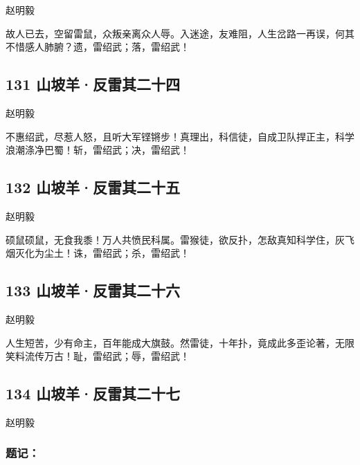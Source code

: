 {赵明毅}

故人已去，空留雷鼠，众叛亲离众人辱。入迷途，友难阻，人生岔路一再误，何其不惜感人肺腑？遗，雷绍武；落，雷绍武！
~\\

\hypertarget{ux5c71ux5761ux7f8aux53cdux96f7ux5176ux4e8cux5341ux56db}{%
\subsection{131
山坡羊·反雷其二十四}\label{ux5c71ux5761ux7f8aux53cdux96f7ux5176ux4e8cux5341ux56db}}

{赵明毅}

不惠绍武，尽惹人怒，且听大军铿锵步！真理出，科信徒，自成卫队捍正主，科学浪潮涤净巴蜀！斩，雷绍武；决，雷绍武！
~\\

\hypertarget{ux5c71ux5761ux7f8aux53cdux96f7ux5176ux4e8cux5341ux4e94}{%
\subsection{132
山坡羊·反雷其二十五}\label{ux5c71ux5761ux7f8aux53cdux96f7ux5176ux4e8cux5341ux4e94}}

{赵明毅}

硕鼠硕鼠，无食我黍！万人共愤民科属。雷猴徒，欲反扑，怎敌真知科学住，灰飞烟灭化为尘土！诛，雷绍武；杀，雷绍武！

\hypertarget{ux5c71ux5761ux7f8aux53cdux96f7ux5176ux4e8cux5341ux516d}{%
\subsection{133
山坡羊·反雷其二十六}\label{ux5c71ux5761ux7f8aux53cdux96f7ux5176ux4e8cux5341ux516d}}

{赵明毅}

人生短苦，少有命主，百年能成大旗鼓。然雷徒，十年扑，竟成此多歪论著，无限笑料流传万古！耻，雷绍武；辱，雷绍武！

\hypertarget{ux5c71ux5761ux7f8aux53cdux96f7ux5176ux4e8cux5341ux4e03}{%
\subsection{134
山坡羊·反雷其二十七}\label{ux5c71ux5761ux7f8aux53cdux96f7ux5176ux4e8cux5341ux4e03}}

{赵明毅}

\hypertarget{ux9898ux8bb0}{%
\subsubsection{题记：}\label{ux9898ux8bb0}}


